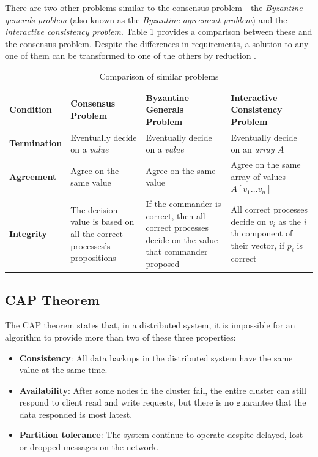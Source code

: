 \documentclass[12pt, a4paper]{article}
\begin{document}
There are two other problems similar to the consensus problem---the
\textit{Byzantine generals problem} (also known as the \textit{Byzantine
agreement problem}) and the \textit{interactive consistency problem}. Table
\ref{tab:dbtap} provides a comparison between these and the consensus problem.
Despite the differences in requirements, a solution to any one of them can be
transformed to one of the others by reduction \cite{fischer1983consensus}.

\begin{table}[htp]
  \centering
  \begin{tabularx}{\linewidth}{lXXX}
  \toprule
  Condition & Consensus Problem & Byzantine Generals Problem
    & Interactive Consistency Problem \\
  \midrule
  \textbf{Termination} & Eventually decide on a \textit{value}
    & Eventually decide on a \textit{value}
    & Eventually decide on an \textit{array $A$} \\
  \addlinespace
  \textbf{Agreement} & Agree on the same value
    & Agree on the same value
    & Agree on the same array of values $A[v_{1} \ldots v_{n}]$ \\
  \addlinespace
  \textbf{Integrity}
    & The decision value is based on all the correct processes's propositions
    & If the commander is correct, then all correct processes decide
      on the value that commander proposed
    & All correct processes decide on $v_{i}$ as the ${i}$th component of their
      vector, if $p_{i}$ is correct \\
  \bottomrule
\end{tabularx}
  \caption{Comparison of similar problems}
  \label{tab:dbtap}
\end{table}

\subsection{CAP Theorem}

The CAP theorem \cite{brewer2012cap} states that, in a distributed system, it is
impossible for an algorithm to provide more than two of these three properties:

\begin{itemize}
	\item \textbf{Consistency}: All data backups in the distributed system have
    the same value at the same time.
	\item \textbf{Availability}: After some nodes in the cluster fail, the entire
    cluster can still respond to client read and write requests, but there is no
    guarantee that the data responded is most latest.
	\item \textbf{Partition tolerance}: The system continue to operate despite
    delayed, lost or dropped messages on the network.
\end{itemize}
\end{document}
